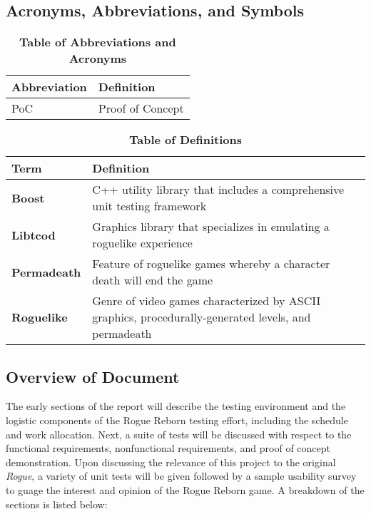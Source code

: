 \documentclass[12pt, titlepage]{article}
\begin{document}
	\subsection{Acronyms, Abbreviations, and Symbols}
		
		\begin{table}[H]
			\centering
			\caption{\textbf{Table of Abbreviations and Acronyms}}
			\label{TableAbbreviations}
			\bigskip
			\begin{tabularx}{\textwidth}{p{3cm}X}
				\toprule
				\textbf{Abbreviation} & \textbf{Definition} \\
				\midrule
				PoC & Proof of Concept\\
				\bottomrule
			\end{tabularx}
		\end{table}

		\begin{table}[H]
			\centering
			\caption{\textbf{Table of Definitions}}
			\label{TableDefinitions}
			\bigskip
			\begin{tabularx}{\textwidth}{p{3cm}X}
				\toprule
				\textbf{Term} & \textbf{Definition}\\
				\midrule
				\textbf{Boost} & C++ utility library that includes a comprehensive unit testing framework\\
				\textbf{Libtcod} & Graphics library that specializes in emulating a roguelike experience\\
				\textbf{Permadeath} & Feature of roguelike games whereby a character death will end the game\\
				\textbf{Roguelike} & Genre of video games characterized by ASCII graphics, procedurally-generated levels, and permadeath\\
				\bottomrule
			\end{tabularx}
		\end{table}	

	\subsection{Overview of Document}
		The early sections of the report will describe the testing environment and the logistic components of the Rogue Reborn testing effort, including the schedule and work allocation.  Next, a suite of tests will be discussed with respect to the functional requirements, nonfunctional requirements, and proof of concept demonstration.  Upon discussing the relevance of this project to the original \textit{Rogue}, a variety of unit tests will be given followed by a sample usability survey to guage the interest and opinion of the Rogue Reborn game.  A breakdown of the sections is listed below:
\end{document}
